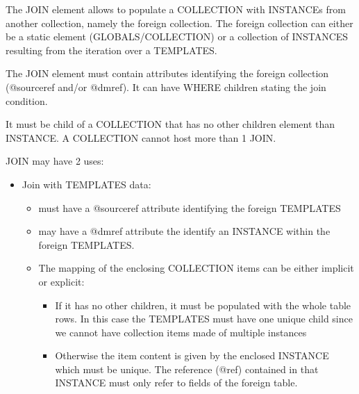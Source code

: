 The JOIN element allows to populate a COLLECTION with INSTANCEs from another collection, namely the foreign collection.
The foreign collection can either be a static element (GLOBALS/COLLECTION) or a collection of INSTANCES resulting from the iteration over a TEMPLATES.

The JOIN element must contain attributes identifying the foreign collection  (@sourceref  and/or @dmref). 
It can have WHERE children stating the join condition.

It must be child of a COLLECTION that has no other children element than INSTANCE. A COLLECTION cannot host more than 1 JOIN.

JOIN may have 2 uses:

\begin{itemize}

  \item Join with TEMPLATES data:
       \begin{itemize}
         \item must have a @sourceref attribute identifying the foreign TEMPLATES
         \item may have a @dmref attribute the identify an INSTANCE within the foreign TEMPLATES.
         \item The mapping of the enclosing COLLECTION items can be either implicit or explicit:
         \begin{itemize}
             \item If it has no other children, it must be populated with the whole table rows. In this case the TEMPLATES must have one unique child 
                      since we cannot have collection items made of multiple instances
             \item Otherwise the item content is given by the enclosed INSTANCE which must be unique.
                     The reference (@ref) contained in that INSTANCE must only refer to fields of the foreign table.
         \end{itemize}
  \end{itemize}


\end{itemize}
